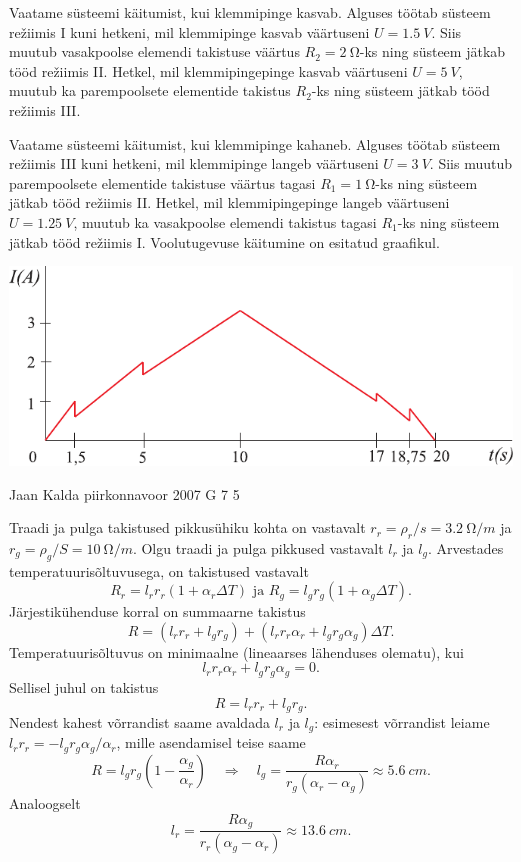 \documentclass[11pt]{article}
\begin{document}
{{Vaatame süsteemi käitumist, kui klemmipinge kasvab. Alguses töötab süsteem režiimis I kuni hetkeni, mil klemmipinge kasvab väärtuseni $U = \SI{1,5}{V}$. Siis muutub vasakpoolse elemendi takistuse väärtus $R_2 = \SI{2}{\ohm}$-ks ning süsteem jätkab tööd režiimis II. Hetkel, mil klemmipingepinge kasvab väärtuseni $U = \SI{5}{V}$, muutub ka parempoolsete elementide takistus $R_2$-ks ning süsteem jätkab tööd režiimis III.

Vaatame süsteemi käitumist, kui klemmipinge kahaneb. Alguses töötab süsteem režiimis III kuni hetkeni, mil klemmipinge langeb väärtuseni $U = \SI{3}{V}$. Siis muutub parempoolsete elementide takistuse väärtus tagasi $R_1 = \SI{1}{\ohm}$-ks ning süsteem jätkab tööd režiimis II. Hetkel, mil klemmipingepinge langeb väärtuseni $U = \SI{1,25}{V}$, muutub ka vasakpoolse elemendi takistus tagasi $R_1$-ks ning süsteem jätkab tööd režiimis I. Voolutugevuse käitumine on esitatud graafikul.

\begin{center}
	\includegraphics[width=0.9\linewidth]{2009-lahg-03-lah}
\end{center}
\fi
}

{Jaan Kalda} %
{piirkonnavoor} %
{2007} %
{G 7} %
{5} %
{

\ifSolution
Traadi ja pulga takistused pikkusühiku kohta on vastavalt $r_r = \rho_r/s = \SI{3,2}{\ohm/m}$ ja $r_g = \rho_g/S = \SI{10}{\ohm/m}$. Olgu traadi ja pulga pikkused vastavalt $l_r$ ja $l_g$. Arvestades temperatuurisõltuvusega, on takistused vastavalt
\[
R_{r}=l_{r} r_{r}\left(1+\alpha_{r} \Delta T\right) \text { ja } R_{g}=l_{g} r_{g}\left(1+\alpha_{g} \Delta T\right).
\]
Järjestikühenduse korral on summaarne takistus
\[
R=\left(l_{r} r_{r}+l_{g} r_{g}\right)+\left(l_{r} r_{r} \alpha_{r}+l_{g} r_{g} \alpha_{g}\right) \Delta T.
\]
Temperatuurisõltuvus on minimaalne (lineaarses lähenduses olematu), kui
\[
l_{r} r_{r} \alpha_{r}+l_{g} r_{g} \alpha_{g}=0.
\]
Sellisel juhul on takistus
\[
R=l_{r} r_{r}+l_{g} r_{g}.
\]
Nendest kahest võrrandist saame avaldada $l_r$ ja $l_g$: esimesest võrrandist leiame $l_rr_r = -l_gr_g\alpha_g/\alpha_r$, mille asendamisel teise saame
\[
R=l_{g} r_{g}\left(1-\frac{\alpha_{g}}{\alpha_{r}}\right) \quad \Rightarrow \quad l_{g}=\frac{R \alpha_{r}}{r_{g}\left(\alpha_{r}-\alpha_{g}\right)} \approx \SI{5,6}{cm}.
\]
Analoogselt
\[
l_{r}=\frac{R \alpha_{g}}{r_{r}\left(\alpha_{g}-\alpha_{r}\right)} \approx \SI{13,6}{cm}.
\]
\fi
}

}
\end{document}
